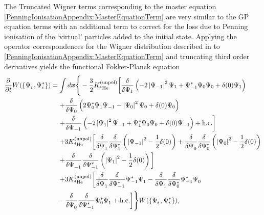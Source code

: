 The Truncated Wigner terms corresponding to the master equation \eqref{PenningIonisationAppendix:MasterEquationTerm} are very similar to the GP equation terms with an additional term to correct for the loss due to Penning ionisation of the `virtual' particles added to the initial state. Applying the operator correspondences for the Wigner distribution described in  to \eqref{PenningIonisationAppendix:MasterEquationTerm} and truncating third order derivatives yields the functional Fokker-Planck equation
\begin{align}
    \begin{split}
    \frac{\partial}{\partial t} W(\left\{ \Psi_i^{\phantom{*}}, \Psi_i^*\right\}) &= \int d \vect{x} \Bigg\{ -\frac{3}{2}\Kunpol\bigg[\frac{\delta}{\delta \Psi_1}\left(-2 \abs{\Psi_{-1}}^2\Psi_1 +\Psi_{-1}^*\Psi_0\Psi_0  + \delta(0) \Psi_1\right)\\
    &\relphantom{=} +\frac{\delta}{\delta \Psi_0}\left(2 \Psi_0^* \Psi_1 \Psi_{-1}  - \abs{\Psi_0}^2 \Psi_0 + \delta(0) \Psi_0\right)\\
    &\relphantom{=} +\frac{\delta}{\delta \Psi_{-1}}\left(- 2 \abs{\Psi_1}^2 \Psi_{-1} + \Psi_1^* \Psi_0 \Psi_0  + \delta(0) \Psi_{-1}\right) + \text{h.c.} \bigg]\\
    &\relphantom{=} + 3 \Kunpol \bigg[\frac{\delta}{\delta \Psi_1^{\phantom{*}}} \frac{\delta}{\delta \Psi_1^*}\left(\abs{\Psi_{-1}}^2 - \frac{1}{2} \delta(0)\right) + \frac{\delta}{\delta \Psi_0^{\phantom{*}}} \frac{\delta}{\delta \Psi_0^*}\left(\abs{\Psi_0}^2 - \frac{1}{2} \delta(0)\right) \\
    &\relphantom{=} + \frac{\delta}{\delta \Psi_{-1}^{\phantom{*}}} \frac{\delta}{\delta \Psi_{-1}^*} \left(\abs{\Psi_1}^2 - \frac{1}{2}\delta(0)\right)\bigg] \\
    &\relphantom{=} +3 \Kunpol\bigg[\frac{\delta}{\delta \Psi_1^{\phantom{*}}}\frac{\delta}{\delta \Psi_{-1}^*}\Psi_{-1}^*\Psi_{1}^{\phantom{*}}  - \frac{\delta}{\delta \Psi_{1}^{\phantom{*}}}\frac{\delta}{\delta \Psi_0^*}\Psi_{-1}^* \Psi_0^{\phantom{*}} \\
    &\relphantom{=} - \frac{\delta}{\delta \Psi_0^{\phantom{*}}}\frac{\delta}{\delta \Psi_{-1}^*} \Psi_0^* \Psi_1^{\phantom{*}} + \text{h.c.} \bigg]\Bigg\}W(\left\{\Psi_i^{\phantom{*}}, \Psi_i^* \right\}),
    \end{split}
    \label{PenningIonisationAppendix:FunctionalFokkerPlanckEquation}
\end{align}
